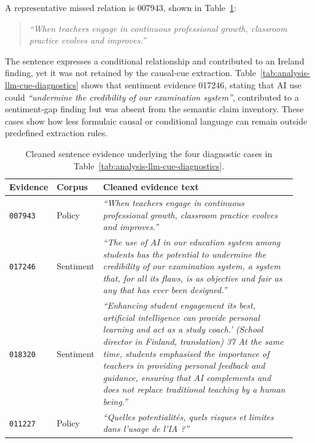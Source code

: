 A representative missed relation is 007943, shown in
Table~\ref{tab:analysis-llm-diagnostic-evidence}:

\begin{quote}
\textit{``When teachers engage in continuous professional growth, classroom practice
evolves and improves.''}
\end{quote}

The sentence expresses a conditional relationship and contributed to an
Ireland finding, yet it was not retained by the causal-cue extraction.
Table~\ref{tab:analysis-llm-cue-diagnostics} shows that sentiment evidence
017246, stating that AI use could \textit{``undermine the credibility of
our examination system''}, contributed to a sentiment-gap finding but was
absent from the semantic claim inventory. These cases show how less formulaic causal
or conditional language can remain outside predefined extraction rules.
\begin{table}[ht]
\centering
\footnotesize
\setlength{\tabcolsep}{4pt}
\renewcommand{\arraystretch}{1.08}
\begin{tabular}{
>{\raggedright\arraybackslash}p{0.13\linewidth}
>{\raggedright\arraybackslash}p{0.12\linewidth}
>{\raggedright\arraybackslash}p{0.68\linewidth}}
\hline
Evidence & Corpus & Cleaned evidence text \\
\hline

\texttt{007943} &
Policy &
\textit{``When teachers engage in continuous professional growth, classroom
practice evolves and improves.''} \\

\texttt{017246} &
Sentiment &
\textit{``The use of AI in our education system among students has the potential
to undermine the credibility of our examination system, a system that, for all
its flaws, is as objective and fair as any that has ever been designed.''} \\

\texttt{018320} &
Sentiment &
\textit{``Enhancing student engagement its best, artificial intelligence can
provide personal learning and act as a study coach.' (School director in Finland,
translation) 37 At the same time, students emphasised the importance of teachers
in providing personal feedback and guidance, ensuring that AI complements and
does not replace traditional teaching by a human being.''} \\

\texttt{011227} &
Policy &
\textit{``Quelles potentialités, quels risques et limites dans l'usage de
l'IA ?''} \\

\hline
\end{tabular}
\caption{Cleaned sentence evidence underlying the four diagnostic cases in
Table~\ref{tab:analysis-llm-cue-diagnostics}.}
\label{tab:analysis-llm-diagnostic-evidence}
\end{table}

